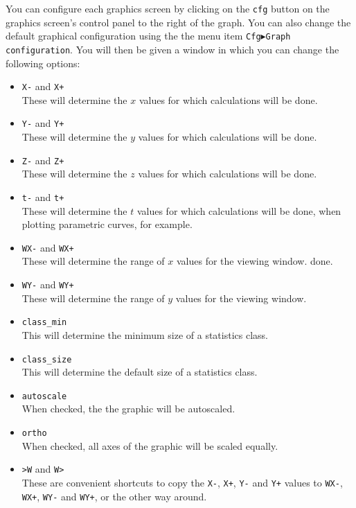 \documentclass[a4paper,11pt]{book}
\begin{document}
You can configure each graphics screen by clicking on the \texttt{cfg}
button on the graphics screen's control panel to the right of the
graph.   You can also change the default graphical configuration using
the the menu item 
\texttt{Cfg$\blacktriangleright$Graph configuration}.
You will then be given a window in which you can
change the following options:
\begin{itemize}
  \item \texttt{X-} and \texttt{X+}\\
  These will determine the $x$ values for which calculations will be
  done.
 
 \item \texttt{Y-} and \texttt{Y+}\\
 These will determine the $y$ values for which calculations will be done.
 
 \item \texttt{Z-} and \texttt{Z+}\\
 These will determine the $z$ values for which calculations will be done.
 
 \item \texttt{t-} and \texttt{t+}\\
 These will determine the $t$ values for which calculations will be
 done, when plotting parametric curves, for example.

  \item \texttt{WX-} and \texttt{WX+}\\
  These will determine the range of $x$ values for the viewing window.
  done.
 
 \item \texttt{WY-} and \texttt{WY+}\\
 These will determine the range of $y$ values for the viewing window.
 

  \item \texttt{class\_min}\\
  This will determine the minimum size of a statistics class.
  
  \item \texttt{class\_size}\\
  This will determine the default size of a statistics class.
  
  \item \texttt{autoscale}\\
  When checked, the the graphic will be autoscaled.
  
  \item \texttt{ortho}\\
  When checked, all axes of the graphic will be scaled equally.
  
  \item \texttt{>W} and \texttt{W>}\\
  These are convenient shortcuts to copy the \texttt{X-}, \texttt{X+},
  \texttt{Y-} and \texttt{Y+} values to  \texttt{WX-}, \texttt{WX+},
  \texttt{WY-} and \texttt{WY+}, or the other way around.
\end{itemize}
\end{document}
